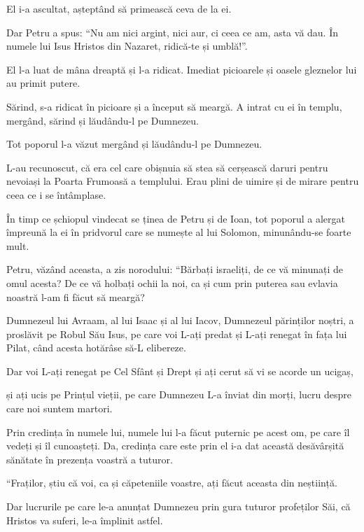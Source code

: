 {El i-a ascultat, așteptând să primească ceva de la ei.

Dar Petru a spus: “Nu am nici argint, nici aur, ci ceea ce am, asta vă dau. În numele lui Isus Hristos din Nazaret, ridică-te și umblă!”.

El l-a luat de mâna dreaptă și l-a ridicat. Imediat picioarele și oasele gleznelor lui au primit putere.

Sărind, s-a ridicat în picioare și a început să meargă. A intrat cu ei în templu, mergând, sărind și lăudându-l pe Dumnezeu.

Tot poporul l-a văzut mergând și lăudându-l pe Dumnezeu.

L-au recunoscut, că era cel care obișnuia să stea să cerșească daruri pentru nevoiași la Poarta Frumoasă a templului. Erau plini de uimire și de mirare pentru ceea ce i se întâmplase.

În timp ce șchiopul vindecat se ținea de Petru și de Ioan, tot poporul a alergat împreună la ei în pridvorul care se numește al lui Solomon, minunându-se foarte mult.


\par }{\PP {}Petru, văzând aceasta, a zis norodului: “Bărbați israeliți, de ce vă minunați de omul acesta? De ce vă holbați ochii la noi, ca și cum prin puterea sau evlavia noastră l-am fi făcut să meargă?

Dumnezeul lui Avraam, al lui Isaac și al lui Iacov, Dumnezeul părinților noștri, a proslăvit pe Robul Său Isus, pe care voi L-ați predat și L-ați renegat în fața lui Pilat, când acesta hotărâse să-L elibereze.

Dar voi L-ați renegat pe Cel Sfânt și Drept și ați cerut să vi se acorde un ucigaș,

și ați ucis pe Prințul vieții, pe care Dumnezeu L-a înviat din morți, lucru despre care noi suntem martori.

Prin credința în numele lui, numele lui l-a făcut puternic pe acest om, pe care îl vedeți și îl cunoașteți. Da, credința care este prin el i-a dat această desăvârșită sănătate în prezența voastră a tuturor.


\par }{\PP {}“Fraților, știu că voi, ca și căpeteniile voastre, ați făcut aceasta din neștiință.

Dar lucrurile pe care le-a anunțat Dumnezeu prin gura tuturor profeților Săi, că Hristos va suferi, le-a împlinit astfel.


}
